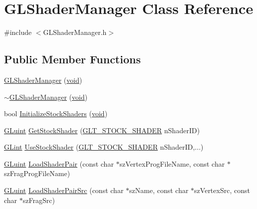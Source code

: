 \hypertarget{class_g_l_shader_manager}{\section{G\-L\-Shader\-Manager Class Reference}
\label{class_g_l_shader_manager}
}


{\ttfamily \#include $<$G\-L\-Shader\-Manager.\-h$>$}

\subsection*{Public Member Functions}
\begin{DoxyCompactItemize}
\item 
\hyperlink{class_g_l_shader_manager_ae47af736ea2f0a91be7585f28374decc}{G\-L\-Shader\-Manager} (\hyperlink{_s_d_l__opengl_8h_a3db05964a3cc4410f35b7ea2b7eb850d}{void})
\item 
\hyperlink{class_g_l_shader_manager_ad6225117648188fb7d12c00bac0de4bf}{$\sim$\-G\-L\-Shader\-Manager} (\hyperlink{_s_d_l__opengl_8h_a3db05964a3cc4410f35b7ea2b7eb850d}{void})
\item 
bool \hyperlink{class_g_l_shader_manager_adf4b9d6ae1e8d7ff13a296ef0ffb37d8}{Initialize\-Stock\-Shaders} (\hyperlink{_s_d_l__opengl_8h_a3db05964a3cc4410f35b7ea2b7eb850d}{void})
\item 
\hyperlink{_g_l_e_w_2glew_8h_a68c4714e43d8e827d80759f9cb864f3c}{G\-Luint} \hyperlink{class_g_l_shader_manager_a063584fcf8c65f036388c924799fa68a}{Get\-Stock\-Shader} (\hyperlink{_g_l_shader_manager_8h_a3cd026d1a745e792d85349d0093c6266}{G\-L\-T\-\_\-\-S\-T\-O\-C\-K\-\_\-\-S\-H\-A\-D\-E\-R} n\-Shader\-I\-D)
\item 
\hyperlink{_g_l_e_w_2glew_8h_acebcc1c5663f14ebde1d16831e5fed94}{G\-Lint} \hyperlink{class_g_l_shader_manager_aa390e9fee2e98d116843c13fd89dbe0c}{Use\-Stock\-Shader} (\hyperlink{_g_l_shader_manager_8h_a3cd026d1a745e792d85349d0093c6266}{G\-L\-T\-\_\-\-S\-T\-O\-C\-K\-\_\-\-S\-H\-A\-D\-E\-R} n\-Shader\-I\-D,...)
\item 
\hyperlink{_g_l_e_w_2glew_8h_a68c4714e43d8e827d80759f9cb864f3c}{G\-Luint} \hyperlink{class_g_l_shader_manager_a84796be60cd914823c4df02dc6271c1f}{Load\-Shader\-Pair} (const char $\ast$sz\-Vertex\-Prog\-File\-Name, const char $\ast$sz\-Frag\-Prog\-File\-Name)
\item 
\hyperlink{_g_l_e_w_2glew_8h_a68c4714e43d8e827d80759f9cb864f3c}{G\-Luint} \hyperlink{class_g_l_shader_manager_a794bac0f2734e15c303e0c46f07c380c}{Load\-Shader\-Pair\-Src} (const char $\ast$sz\-Name, const char $\ast$sz\-Vertex\-Src, const char $\ast$sz\-Frag\-Src)

\end{DoxyCompactItemize}
